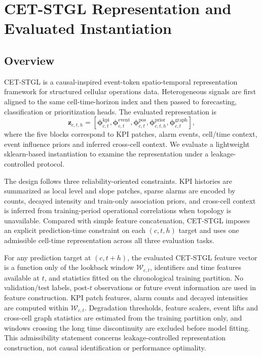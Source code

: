 \section{CET-STGL Representation and Evaluated Instantiation}
\label{sec:methodology}

\subsection{Overview}
CET-STGL is a causal-inspired event-token spatio-temporal representation framework for structured cellular operations data. Heterogeneous signals are first aligned to the same cell-time-horizon index and then passed to forecasting, classification or prioritization heads. The evaluated representation is
\begin{equation}
    \mathbf{z}_{c,t,h}=
    [\boldsymbol{\phi}^{\mathrm{kpi}}_{c,t},
    \boldsymbol{\phi}^{\mathrm{event}}_{c,t},
    \boldsymbol{\phi}^{\mathrm{pos}}_{c,t},
    \boldsymbol{\phi}^{\mathrm{prior}}_{c,t,h},
    \boldsymbol{\phi}^{\mathrm{graph}}_{c,t}],
\end{equation}
where the five blocks correspond to KPI patches, alarm events, cell/time context, event influence priors and inferred cross-cell context. We evaluate a lightweight sklearn-based instantiation to examine the representation under a leakage-controlled protocol.

The design follows three reliability-oriented constraints. KPI histories are summarized as local level and slope patches, sparse alarms are encoded by counts, decayed intensity and train-only association priors, and cross-cell context is inferred from training-period operational correlations when topology is unavailable. Compared with simple feature concatenation, CET-STGL imposes an explicit prediction-time constraint on each $(c,t,h)$ target and uses one admissible cell-time representation across all three evaluation tasks.

For any prediction target at $(c,t+h)$, the evaluated CET-STGL feature vector is a function only of the lookback window $\mathcal{W}_{c,t}$, identifiers and time features available at $t$, and statistics fitted on the chronological training partition. No validation/test labels, post-$t$ observations or future event information are used in feature construction. KPI patch features, alarm counts and decayed intensities are computed within $\mathcal{W}_{c,t}$. Degradation thresholds, feature scalers, event lifts and cross-cell graph statistics are estimated from the training partition only, and windows crossing the long time discontinuity are excluded before model fitting. This admissibility statement concerns leakage-controlled representation construction, not causal identification or performance optimality.

